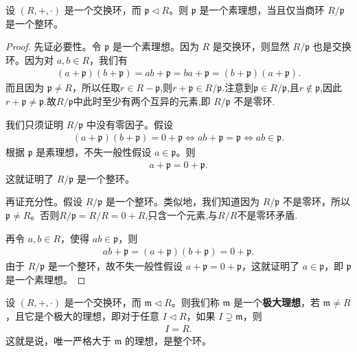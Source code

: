 \documentclass[../../main.tex]{subfiles}
\begin{document}
\begin{proposition}[素理想的充要条件]\label{proposition:素理想的充要条件}
设 $(R, +, \cdot)$ 是一个交换环，而 $\mathfrak{p} \lhd R$。则 $\mathfrak{p}$ 是一个素理想，当且仅当商环 $R / \mathfrak{p}$ 是一个整环。
\end{proposition}
\begin{proof}
先证必要性。令 $\mathfrak{p}$ 是一个素理想。因为 $R$ 是交换环，则显然 $R / \mathfrak{p}$ 也是交换环。因为对 $a, b \in R$，我们有
\begin{align*}
(a + \mathfrak{p})(b + \mathfrak{p}) = ab + \mathfrak{p} = ba + \mathfrak{p} = (b + \mathfrak{p})(a + \mathfrak{p}).
\end{align*}
而且因为 $\mathfrak{p} \neq R$，所以任取$r\in R-\mathfrak{p}$,则$r+\mathfrak{p}\in R/\mathfrak{p}$.注意到$\mathfrak{p}\in R/\mathfrak{p}$,且$r\notin \mathfrak{p}$,因此$r+\mathfrak{p}\ne \mathfrak{p}$.故$R/\mathfrak{p}$中此时至少有两个互异的元素,即 $R / \mathfrak{p}$ 不是零环.

我们只须证明 $R / \mathfrak{p}$ 中没有零因子。假设
\begin{align*}
(a+\mathfrak{p} )(b+\mathfrak{p} )=0+\mathfrak{p} \Leftrightarrow ab+\mathfrak{p} =\mathfrak{p} \Leftrightarrow ab\in \mathfrak{p} .
\end{align*}
根据 $\mathfrak{p}$ 是素理想，不失一般性假设 $a \in \mathfrak{p}$。则
\begin{align*}
a + \mathfrak{p} = 0 + \mathfrak{p} .
\end{align*}
这就证明了 $R / \mathfrak{p}$ 是一个整环。

再证充分性。假设 $R / \mathfrak{p}$ 是一个整环。类似地，我们知道因为 $R / \mathfrak{p}$ 不是零环，所以 $\mathfrak{p} \neq R$。否则$R/\mathfrak{p}=R/R={0+R}$,只含一个元素,与$R/R$不是零环矛盾.

再令 $a, b \in R$，使得 $ab \in \mathfrak{p}$，则
\begin{align*}
ab + \mathfrak{p} = (a + \mathfrak{p})(b + \mathfrak{p}) = 0 + \mathfrak{p}.
\end{align*}
由于 $R / \mathfrak{p}$ 是一个整环，故不失一般性假设 $a + \mathfrak{p} = 0 + \mathfrak{p}$，这就证明了 $a \in \mathfrak{p}$，即 $\mathfrak{p}$ 是一个素理想。 
\end{proof}

\begin{definition}[极大理想]
设 $(R, +, \cdot)$ 是一个交换环，而 $\mathfrak{m} \lhd R$。则我们称 $\mathfrak{m}$ 是一个\textbf{极大理想}，若 $\mathfrak{m} \neq R$，且它是个极大的理想，即对于任意 $I \lhd R$，如果 $I \supsetneq \mathfrak{m}$，则
\begin{align*}
I = R .
\end{align*}
这就是说，唯一严格大于 $\mathfrak{m}$ 的理想，是整个环。
\end{definition}
\end{document}
